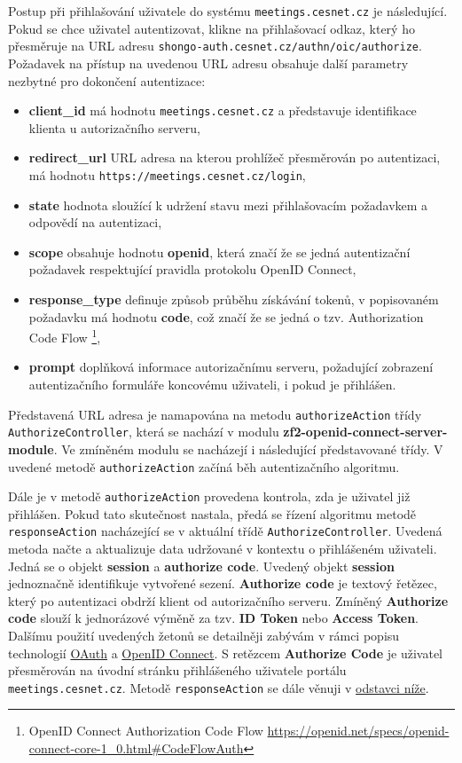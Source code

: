 \documentclass[
  printed, %
  twoside, %
  table,   %
  nolof,     %
  nolot,     %
]{fithesis3}
\begin{document}
Postup při přihlašování uživatele do systému \texttt{meetings.cesnet.cz} je následující. Pokud se chce uživatel autentizovat, klikne na přihlašovací odkaz, který ho přesměruje na URL adresu \texttt{shongo-auth.cesnet.cz/authn/oic/authorize}. Požadavek na přístup na uvedenou URL adresu obsahuje další parametry nezbytné pro dokončení autentizace:
\label{shongo:state}
\begin{itemize}
    \item \textbf{client\_id} má hodnotu \texttt{meetings.cesnet.cz} a představuje identifikace klienta u autorizačního serveru,
    \item \textbf{redirect\_url} URL adresa na kterou prohlížeč přesměrován po autentizaci, má hodnotu \texttt{https://meetings.cesnet.cz/login}, 
    \item \textbf{state} hodnota sloužící k udržení stavu mezi přihlašovacím požadavkem a odpovědí na autentizaci, 
    \item \textbf{scope} obsahuje hodnotu \textbf{openid}, která značí že se jedná autentizační požadavek respektující pravidla protokolu OpenID Connect,
    \item \textbf{response\_type} definuje způsob průběhu získávání tokenů, v popisovaném požadavku má hodnotu \textbf{code}, což značí že se jedná o tzv. Authorization Code Flow \footnote{OpenID Connect Authorization Code Flow \url{https://openid.net/specs/openid-connect-core-1_0.html\#CodeFlowAuth}},
    \item \textbf{prompt} doplňková informace autorizačnímu serveru, požadující zobrazení autentizačního formuláře koncovému uživateli, i pokud je přihlášen. 
\end{itemize}


Představená URL adresa je namapována na metodu \texttt{authorizeAction} třídy \texttt{AuthorizeController}, která se nachází v modulu \textbf{zf2-openid-connect-server-module}. Ve zmíněném modulu  se nacházejí i následující představované třídy. V uvedené metodě \texttt{authorizeAction} začíná běh autentizačního algoritmu. \par 

Dále je v metodě \texttt{authorizeAction} provedena kontrola, zda je uživatel již přihlášen. Pokud tato skutečnost nastala, předá se řízení algoritmu metodě \texttt{responseAction} nacházející se v aktuální třídě \texttt{AuthorizeController}. Uvedená metoda načte a  aktualizuje data udržované v kontextu o přihlášeném uživateli. Jedná se o objekt \textbf{session} a \textbf{authorize code}. Uvedený objekt \textbf{session} jednoznačně identifikuje vytvořené sezení. \textbf{Authorize code} je textový řetězec, který po autentizaci obdrží klient od autorizačního serveru. Zmíněný \textbf{Authorize code} slouží k jednorázové výměně za tzv. \textbf{ID Token} nebo \textbf{Access Token}. Dalšímu použití uvedených žetonů se detailněji zabývám v rámci popisu technologií \hyperref[sec:oauth]{OAuth} a \hyperref[sec:oidc]{OpenID Connect}. S retězcem \textbf{Authorize Code} je uživatel přesměrován na úvodní stránku přihlášeného uživatele portálu \texttt{meetings.cesnet.cz}. Metodě \texttt{responseAction} se dále věnuji v \hyperref[sec:responseAction]{odstavci níže}. \par 
\end{document}
